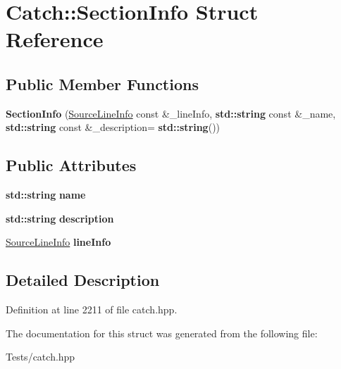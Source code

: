 \hypertarget{struct_catch_1_1_section_info}{}\section{Catch\+:\+:Section\+Info Struct Reference}
\label{struct_catch_1_1_section_info}
\subsection*{Public Member Functions}
\begin{DoxyCompactItemize}
\item 
\mbox{\label{struct_catch_1_1_section_info_a27aff3aaf8b6611f3651b17111a272c6}} 
{\bfseries Section\+Info} (\hyperlink{struct_catch_1_1_source_line_info}{Source\+Line\+Info} const \&\+\_\+line\+Info, \textbf{ std\+::string} const \&\+\_\+name, \textbf{ std\+::string} const \&\+\_\+description=\textbf{ std\+::string}())
\end{DoxyCompactItemize}
\subsection*{Public Attributes}
\begin{DoxyCompactItemize}
\item 
\mbox{\label{struct_catch_1_1_section_info_a704c8fc662d309137e0d4f199cb7df58}} 
\textbf{ std\+::string} {\bfseries name}
\item 
\mbox{\label{struct_catch_1_1_section_info_a0052060219a6de74bb7ade34d4163a4e}} 
\textbf{ std\+::string} {\bfseries description}
\item 
\mbox{\label{struct_catch_1_1_section_info_adbc83b8a3507c4acc8ee249e93465711}} 
\hyperlink{struct_catch_1_1_source_line_info}{Source\+Line\+Info} {\bfseries line\+Info}
\end{DoxyCompactItemize}


\subsection{Detailed Description}


Definition at line 2211 of file catch.\+hpp.



The documentation for this struct was generated from the following file\+:\begin{DoxyCompactItemize}
\item 
Tests/catch.\+hpp\end{DoxyCompactItemize}
